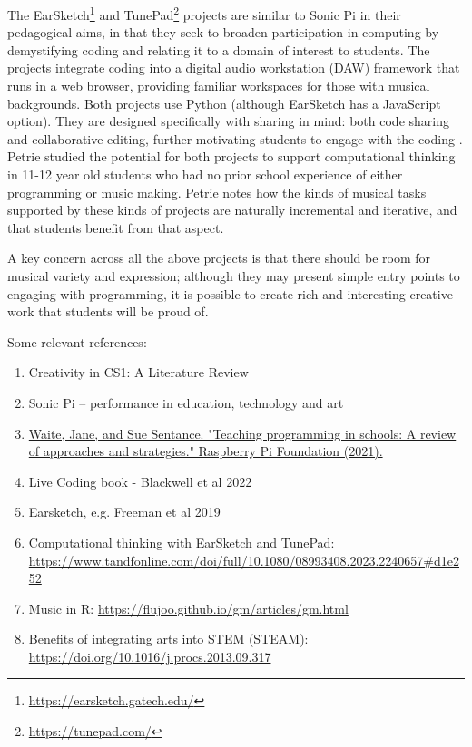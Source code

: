 The EarSketch\footnote{\url{https://earsketch.gatech.edu/}} \cite{engelman_earsketch_2017} and TunePad\footnote{\url{https://tunepad.com/}} projects are similar to Sonic Pi in their pedagogical aims, in that they seek to broaden participation in computing by demystifying coding and relating it to a domain of interest to students. The projects integrate coding into a digital audio workstation (DAW) framework that runs in a web browser, providing familiar workspaces for those with musical backgrounds. Both projects use Python (although EarSketch has a JavaScript option). They are designed specifically with sharing in mind: both code sharing and collaborative editing, further motivating students to engage with the coding \cite{freeman_earsketch_2019}. Petrie \cite{petrie_ct_2024} studied the potential for both projects to support computational thinking in 11-12 year old students who had no prior school experience of either programming or music making. Petrie notes how the kinds of musical tasks supported by these kinds of projects are naturally incremental and iterative, and that students benefit from that aspect.


A key concern across all the above projects is that there should be room for musical variety and expression; although they may present simple entry points to engaging with programming, it is possible to create rich and interesting creative work that students will be proud of.


Some relevant references:
\begin{enumerate}
\item Creativity in CS1: A Literature Review \cite{Sharmin2021}
\item Sonic Pi – performance in education, technology and art \cite{Aaron2016}
\item \href{https://www.raspberrypi.org/app/uploads/2021/11/Teaching-programming-in-schools-pedagogy-review-Raspberry-Pi-Foundation.pdf}{Waite, Jane, and Sue Sentance. "Teaching programming in schools: A review of approaches and strategies." Raspberry Pi Foundation (2021).}
\item Live Coding book - Blackwell et al 2022
\item Earsketch, e.g. Freeman et al 2019
\item Computational thinking with EarSketch and TunePad: \url{https://www.tandfonline.com/doi/full/10.1080/08993408.2023.2240657#d1e252}
\item Music in R: \href{https://flujoo.github.io/gm/articles/gm.html}{https://flujoo.github.io/gm/articles/gm.html}
\item Benefits of integrating arts into STEM (STEAM): \href{https://doi.org/10.1016/j.procs.2013.09.317}{https://doi.org/10.1016/j.procs.2013.09.317}
\end{enumerate}

